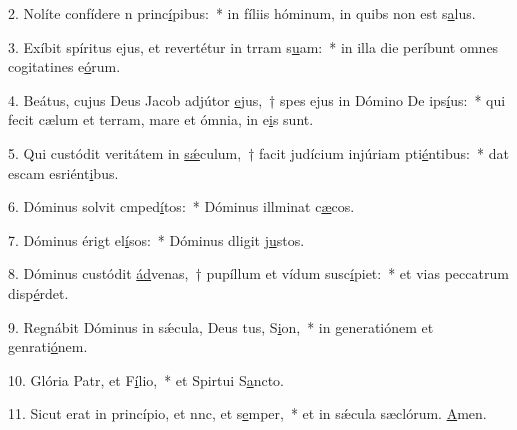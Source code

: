2. Nolíte confídere n princ\uline{í}pibus:~* in fíliis hóminum, in quibs non est s\uline{a}lus.\par 
3. Exíbit spíritus ejus, et revertétur in trram s\uline{u}am:~* in illa die períbunt omnes cogitatines e\uline{ó}rum.\par 
4. Beátus, cujus Deus Jacob adjútor \uline{e}jus,~† spes ejus in Dómino De ips\uline{í}us:~* qui fecit cælum et terram, mare et ómnia,  in e\uline{i}s sunt.\par 
5. Qui custódit veritátem in \uline{sǽ}culum,~† facit judícium injúriam pti\uline{é}ntibus:~* dat escam esriént\uline{i}bus.\par 
6. Dóminus solvit cmped\uline{í}tos:~* Dóminus illminat c\uline{æ}cos.\par 
7. Dóminus érigt el\uline{í}sos:~* Dóminus dligit j\uline{u}stos.\par 
8. Dóminus custódit \uline{ád}venas,~† pupíllum et vídum susc\uline{í}piet:~* et vias peccatrum disp\uline{é}rdet.\par 
9. Regnábit Dóminus in sǽcula, Deus tus, S\uline{i}on,~* in generatiónem et genrati\uline{ó}nem.\par 
10. Glória Patr, et F\uline{í}lio,~* et Spirtui S\uline{a}ncto.\par 
11. Sicut erat in princípio, et nnc, et s\uline{e}mper,~* et in sǽcula sæclórum. \uline{A}men.\par 
